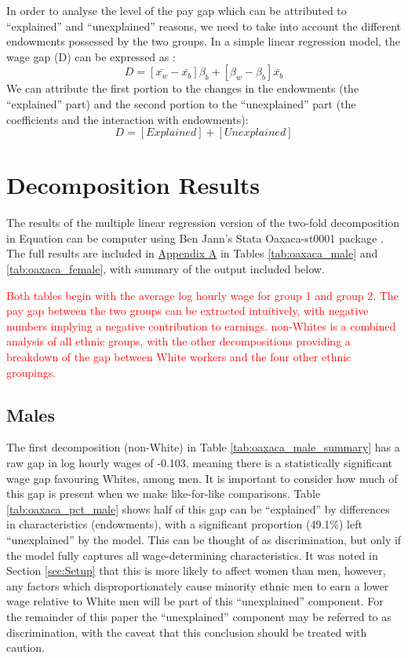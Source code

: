 \documentclass[class=article, crop=false]{standalone}
\begin{document}
In order to analyse the level of the pay gap which can be attributed to \enquote{explained} and \enquote{unexplained} reasons, we need to take into account the different endowments possessed by the two groups. In a simple linear regression model, the wage gap (D) can be expressed as \citep{WB}:
\begin{equation}
  D = [\bar{x_{w}} - \bar{x_{b}}]\beta_{b} + [\beta_{w} - \beta_{b}]\bar{x_{b}}
  \label{eq:1}
\end{equation}
We can attribute the first portion to the changes in the endowments (the \enquote{explained} part) and the second portion to the \enquote{unexplained} part (the coefficients and the interaction with endowments):
\begin{equation}
  D = [Explained] + [Unexplained]
  \label{eq:2}
\end{equation}

\section{Decomposition Results}
\label{sec:Decomposition Results}
The results of the multiple linear regression version of the two-fold decomposition in Equation \label{eq:1} can be computer using Ben Jann's Stata Oaxaca-st0001 package \citep{Jann}. The full results are included in \hyperref[sec:appendixA]{Appendix A} in Tables \ref{tab:oaxaca_male} and \ref{tab:oaxaca_female}, with summary of the output included below.

\textcolor{red}{Both tables begin with the average log hourly wage for group 1 and group 2. The pay gap between the two groups can be extracted intuitively, with negative numbers implying a negative contribution to earnings. non-Whites is a combined analysis of all ethnic groups, with the other decompositions providing a breakdown of the gap between White workers and the four other ethnic groupings.}

\subsection{Males}
\label{sec:Males}
The first decomposition (non-White) in Table \ref{tab:oaxaca_male_summary} has a raw gap in log hourly wages of -0.103, meaning there is a statistically significant wage gap favouring Whites, among men. It is important to consider how much of this gap is present when we make like-for-like comparisons. Table \ref{tab:oaxaca_pct_male} shows half of this gap can be \enquote{explained} by differences in characteristics (endowments), with a significant proportion (49.1\%) left \enquote{unexplained} by the model. This can be thought of as discrimination, but only if the model fully captures all wage-determining characteristics. It was noted in Section \ref{sec:Setup} that this is more likely to affect women than men, however, any factors which disproportionately cause minority ethnic men to earn a lower wage relative to White men will be part of this \enquote{unexplained} component. For the remainder of this paper the \enquote{unexplained} component may be referred to as discrimination, with the caveat that this conclusion should be treated with caution.
\end{document}
